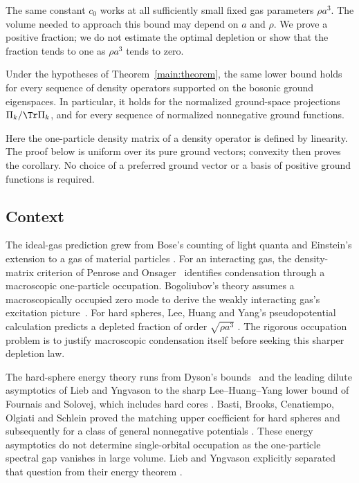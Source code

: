 The same constant $c_0$ works at all sufficiently small fixed gas
parameters $\rho a^3$. The volume needed to approach this bound may
depend on $a$ and $\rho$. We prove a positive fraction; we do not
estimate the optimal depletion or show that the fraction tends to one
as $\rho a^3$ tends to zero.

\begin{corollary}\label{main:mixed}
Under the hypotheses of Theorem~\ref{main:theorem}, the same lower
bound holds for every sequence of density operators supported on the
bosonic ground eigenspaces. In particular, it holds for the normalized
ground-space projections $\Pi_k/\Tr\Pi_k$, and for every sequence of
normalized nonnegative ground functions.
\end{corollary}

Here the one-particle density matrix of a density operator is defined by
linearity. The proof below is uniform over its pure ground vectors;
convexity then proves the corollary. No choice of a preferred ground
vector or a basis of positive ground functions is required.

\subsection{Context}

The ideal-gas prediction grew from Bose's counting of light quanta and
Einstein's extension to a gas of material particles
\cite{Bose1924,Einstein1924IdealGas,Einstein1925IdealGas}.
For an interacting gas, the density-matrix criterion of Penrose and
Onsager~\cite{PenroseOnsager1956} identifies condensation through a
macroscopic one-particle occupation. Bogoliubov's theory assumes a
macroscopically occupied zero mode to derive the weakly interacting gas's
excitation picture~\cite[pp.~24--25]{Bogoliubov1947}. For hard spheres,
Lee, Huang and Yang's pseudopotential calculation predicts a depleted
fraction of order $\sqrt{\rho a^3}$
\cite[Section~III]{LeeHuangYang1957}. The rigorous occupation problem is
to justify macroscopic condensation itself before seeking this sharper
depletion law.

The hard-sphere energy theory runs from Dyson's bounds~\cite{Dyson1957}
and the leading dilute asymptotics of Lieb and Yngvason
\cite{LiebYngvason1998} to the sharp Lee--Huang--Yang lower bound of
Fournais and Solovej, which includes hard cores
\cite{FournaisSolovej2023}. Basti, Brooks, Cenatiempo, Olgiati and
Schlein proved the matching upper coefficient for hard spheres and
subsequently for a class of general nonnegative potentials
\cite{BastiEtAl2026HardSpheres,BastiEtAl2026GeneralPotentials}.
These energy asymptotics do not determine single-orbital occupation as
the one-particle spectral gap vanishes in large volume. Lieb and
Yngvason explicitly separated that question from their energy theorem
\cite{LiebYngvason1998}.

